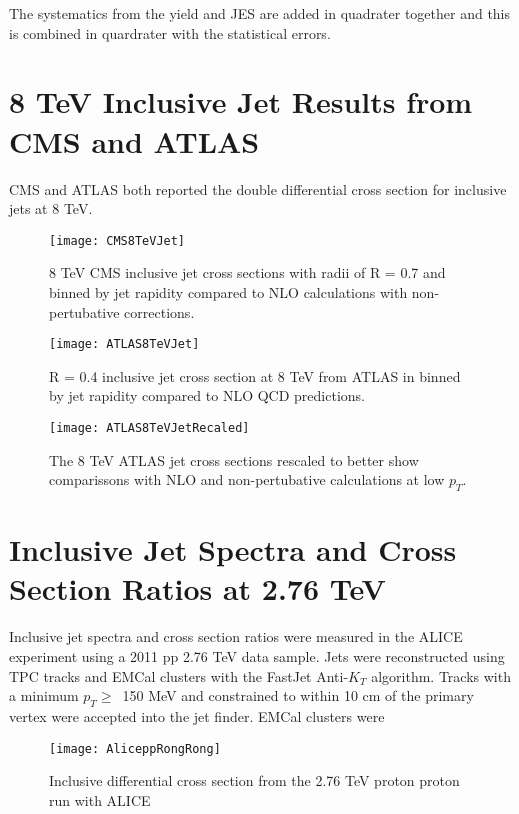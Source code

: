 \noindent

The systematics from the yield and JES are added in quadrater together and this is combined in quardrater with the statistical errors.

\section{8 TeV Inclusive Jet Results from CMS and ATLAS}

CMS\cite{CMS:2013kda} and ATLAS\cite{Aaboud:2017dvo} both reported the double differential cross section for inclusive jets at 8 TeV.  

\begin{figure}[h]
\texttt{[image: CMS8TeVJet]}
\centering
\caption{8 TeV CMS inclusive jet cross sections with radii of R = 0.7 and binned by jet rapidity compared to NLO calculations with non-pertubative corrections\cite{CMS:2013kda}.}
\label{fig:CMS8TeVRescale}
\end{figure}

\begin{figure}[h]
\texttt{[image: ATLAS8TeVJet]}
\centering
\caption{R = 0.4 inclusive jet cross section at 8 TeV from ATLAS in binned by jet rapidity compared to NLO QCD predictions\cite{Aaboud:2017dvo}.}
\label{fig:ATLAS8TeV}
\end{figure}

\begin{figure}[h]
\texttt{[image: ATLAS8TeVJetRecaled]}
\centering
\caption{The 8 TeV ATLAS jet cross sections rescaled to better show comparissons with NLO and non-pertubative calculations at low $p_{T}$\cite{Aaboud:2017dvo}.}
\label{fig:ATLAS8TeVRescale}
\end{figure}

\section{Inclusive Jet Spectra and Cross Section Ratios at 2.76 TeV}
Inclusive jet spectra and cross section ratios were measured in the ALICE experiment using a 2011 pp 2.76 TeV data sample\cite{MA2013319}.  Jets were reconstructed using TPC tracks and EMCal clusters with the FastJet Anti-$K_{T}$ algorithm.  Tracks with a minimum $p_{T} \geq \,$ 150 MeV and constrained to within 10 cm of the primary vertex were accepted into the jet finder.  EMCal clusters were 

\begin{figure}[h]
\texttt{[image: AliceppRongRong]}
\centering
\caption{Inclusive differential cross section from the 2.76 TeV proton proton run with ALICE}
\label{fig:RunEff}
\end{figure}

